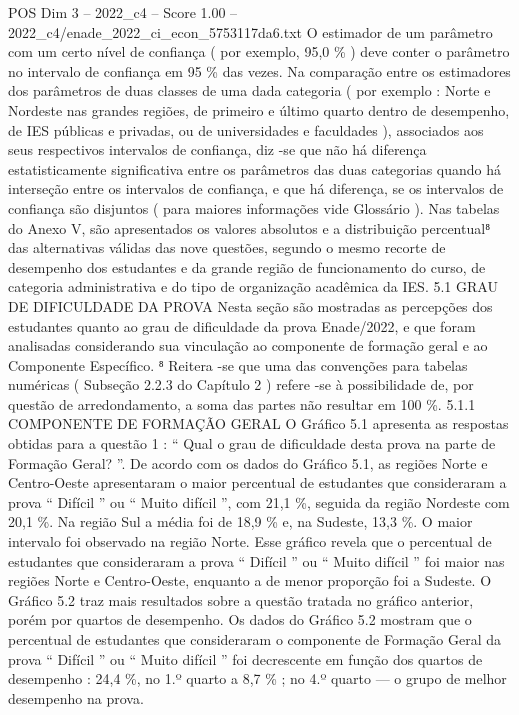 \begin{textsample}{POS Dim 3 – 2022\_c4 – Score 1.00 – 2022\_c4/enade\_2022\_ci\_econ\_5753117da6.txt}
O estimador de um parâmetro com um certo nível de confiança ( por exemplo, 95,0 \% ) deve conter o parâmetro no intervalo de confiança em 95 \% das vezes.
Na comparação entre os estimadores dos parâmetros de duas classes de uma dada categoria ( por exemplo : Norte e Nordeste nas grandes regiões, de primeiro e último quarto dentro de desempenho, de IES públicas e privadas, ou de universidades e faculdades ), associados aos seus respectivos intervalos de confiança, diz -se que não há diferença estatisticamente significativa entre os parâmetros das duas categorias quando há interseção entre os intervalos de confiança, e que há diferença, se os intervalos de confiança são disjuntos ( para maiores informações vide Glossário ).
Nas tabelas do Anexo V, são apresentados os valores absolutos e a distribuição percentual⁸ das alternativas válidas das nove questões, segundo o mesmo recorte de desempenho dos estudantes e da grande região de funcionamento do curso, de categoria administrativa e do tipo de organização acadêmica da IES. 5.1 GRAU DE DIFICULDADE DA PROVA Nesta seção são mostradas as percepções dos estudantes quanto ao grau de dificuldade da prova Enade/2022, e que foram analisadas considerando sua vinculação ao componente de formação geral e ao Componente Específico. ⁸ Reitera -se que uma das convenções para tabelas numéricas ( Subseção 2.2.3 do Capítulo 2 ) refere -se à possibilidade de, por questão de arredondamento, a soma das partes não resultar em 100 \%. 5.1.1 COMPONENTE DE FORMAÇÃO GERAL O Gráfico 5.1 apresenta as respostas obtidas para a questão 1 : “ Qual o grau de dificuldade desta prova na parte de Formação Geral? ”.
De acordo com os dados do Gráfico 5.1, as regiões Norte e Centro-Oeste apresentaram o maior percentual de estudantes que consideraram a prova “ Difícil ” ou “ Muito difícil ”, com 21,1 \%, seguida da região Nordeste com 20,1 \%.
Na região Sul a média foi de 18,9 \% e, na Sudeste, 13,3 \%.
O maior intervalo foi observado na região Norte.
Esse gráfico revela que o percentual de estudantes que consideraram a prova “ Difícil ” ou “ Muito difícil ” foi maior nas regiões Norte e Centro-Oeste, enquanto a de menor proporção foi a Sudeste.
O Gráfico 5.2 traz mais resultados sobre a questão tratada no gráfico anterior, porém por quartos de desempenho.
Os dados do Gráfico 5.2 mostram que o percentual de estudantes que consideraram o componente de Formação Geral da prova “ Difícil ” ou “ Muito difícil ” foi decrescente em função dos quartos de desempenho : 24,4 \%, no 1.º quarto a 8,7 \% ; no 4.º quarto — o grupo de melhor desempenho na prova.

\end{textsample}
